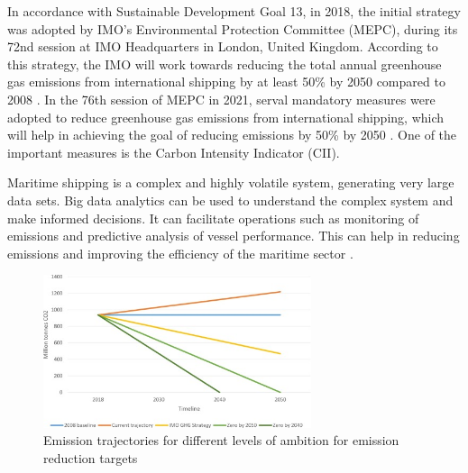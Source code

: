 In accordance with Sustainable Development Goal 13, in 2018, the initial strategy was adopted by IMO's Environmental Protection Committee (MEPC),
during its 72nd session at IMO Headquarters in London, United Kingdom. According to this strategy,
the IMO will work towards reducing the total annual greenhouse gas emissions from international shipping by at least 50\% by 2050 compared to 2008 \autocite{imo-2018}.
In the 76th session of MEPC in 2021, serval mandatory measures were adopted to reduce greenhouse gas emissions from international shipping,
which will help in achieving the goal of reducing emissions by 50\% by 2050 \autocite{imo-2021}.
One of the important measures is the Carbon Intensity Indicator (CII).

Maritime shipping is a complex and highly volatile system, generating very large data sets.
Big data analytics can be used to understand the complex system and make informed decisions.
It can facilitate operations such as monitoring of emissions and predictive analysis of vessel performance.
This can help in reducing emissions and improving the efficiency of the maritime sector \autocite{ZAMAN2017537}.

\begin{figure}[ht]
    \centering
    \includegraphics[width=0.7\textwidth]{images/emission_trajactory.jpg}
    \caption{Emission trajectories for different levels of ambition for emission reduction targets}
    \label{emissionTrajectory}
\end{figure}







